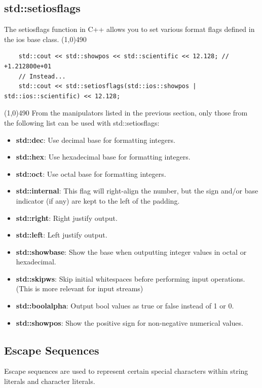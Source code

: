 \documentclass{report}
\begin{document}
    \pagebreak \bigbreak \noindent 
    \subsection{std::setiosflags}
    The setiosflags function in C++ allows you to set various format flags defined in the ios base class. 
    \bigbreak \noindent 
    \line(1,0){490}
    \begin{verbatim}
    std::cout << std::showpos << std::scientific << 12.128; // +1.212800e+01
    // Instead...
    std::cout << std::setiosflags(std::ios::showpos | std::ios::scientific) << 12.128; 
    \end{verbatim}
    \line(1,0){490}
    \bigbreak \noindent 
    From the manipulators listed in the previous section, only those from the following list can be used with std::setiosflags:
    \begin{itemize}
        \item \textbf{std::dec}: Use decimal base for formatting integers.
        \item \textbf{std::hex}: Use hexadecimal base for formatting integers.
        \item \textbf{std::oct}: Use octal base for formatting integers.
        \item \textbf{std::internal}: This flag will right-align the number, but the sign and/or base indicator (if any) are kept to the left of the padding.
        \item \textbf{std::right}: Right justify output.
        \item \textbf{std::left}: Left justify output.
        \item \textbf{std::showbase}: Show the base when outputting integer values in octal or hexadecimal.
        \item \textbf{std::skipws}: Skip initial whitespaces before performing input operations. (This is more relevant for input streams)
        \item \textbf{std::boolalpha}: Output bool values as true or false instead of 1 or 0.
        \item \textbf{std::showpos}: Show the positive sign for non-negative numerical values.
    \end{itemize}

    \bigbreak \noindent 
    \subsection{Escape Sequences}
    \bigbreak \noindent 
    Escape sequences are used to represent certain special characters within string literals and character literals.
    \bigbreak \noindent 
\end{document}
